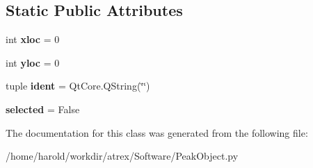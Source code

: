 \subsection*{Static Public Attributes}
\begin{DoxyCompactItemize}
\item 
\hypertarget{classPeakObject_1_1PeakObject_a547374a82aab09bcf28e13ecfb598117}{int {\bfseries xloc} = 0}\label{classPeakObject_1_1PeakObject_a547374a82aab09bcf28e13ecfb598117}

\item 
\hypertarget{classPeakObject_1_1PeakObject_abebfb4985f9b0b73e6b1e20cb5a56f18}{int {\bfseries yloc} = 0}\label{classPeakObject_1_1PeakObject_abebfb4985f9b0b73e6b1e20cb5a56f18}

\item 
\hypertarget{classPeakObject_1_1PeakObject_a5d69241780c9ba49bccd1a76c3ef2738}{tuple {\bfseries ident} = Qt\-Core.\-Q\-String(\char`\"{}\char`\"{})}\label{classPeakObject_1_1PeakObject_a5d69241780c9ba49bccd1a76c3ef2738}

\item 
\hypertarget{classPeakObject_1_1PeakObject_aa0095eabde0eeb9ed146a052f7dea921}{{\bfseries selected} = False}\label{classPeakObject_1_1PeakObject_aa0095eabde0eeb9ed146a052f7dea921}

\end{DoxyCompactItemize}


The documentation for this class was generated from the following file\-:\begin{DoxyCompactItemize}
\item 
/home/harold/workdir/atrex/\-Software/Peak\-Object.\-py\end{DoxyCompactItemize}
